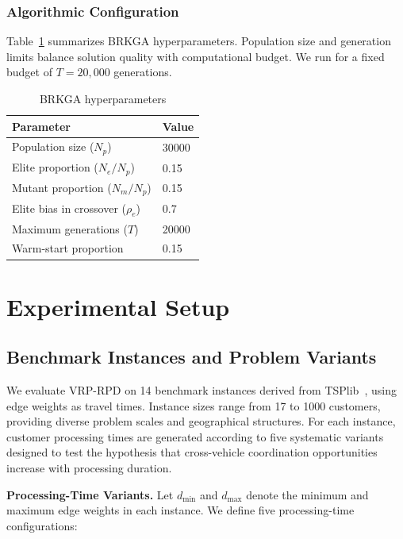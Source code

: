 \documentclass{article}
\begin{document}
\subsubsection{Algorithmic Configuration}

Table~\ref{tab:brkga_config} summarizes BRKGA hyperparameters. Population size and generation limits balance solution quality with computational budget. We run for a fixed budget of $T = 20{,}000$ generations.

\begin{table}[t]
\centering
\caption{BRKGA hyperparameters}
\label{tab:brkga_config}
\begin{tabular}{ll}
\toprule
Parameter & Value \\
\midrule
Population size ($N_p$) & 30000 \\
Elite proportion ($N_e / N_p$) & 0.15 \\
Mutant proportion ($N_m / N_p$) & 0.15 \\
Elite bias in crossover ($\rho_e$) & 0.7 \\
Maximum generations ($T$) & 20000 \\
Warm-start proportion & 0.15 \\
\bottomrule
\end{tabular}
\end{table}

\section{Experimental Setup}
\label{sec:experiments}

\subsection{Benchmark Instances and Problem Variants}

We evaluate VRP-RPD on 14 benchmark instances derived from TSPlib~\cite{reinelt1991tsplib}, using edge weights as travel times. Instance sizes range from 17 to 1000 customers, providing diverse problem scales and geographical structures. For each instance, customer processing times are generated according to five systematic variants designed to test the hypothesis that cross-vehicle coordination opportunities increase with processing duration.

\textbf{Processing-Time Variants.} Let $d_{\min}$ and $d_{\max}$ denote the minimum and maximum edge weights in each instance. We define five processing-time configurations:
\end{document}
